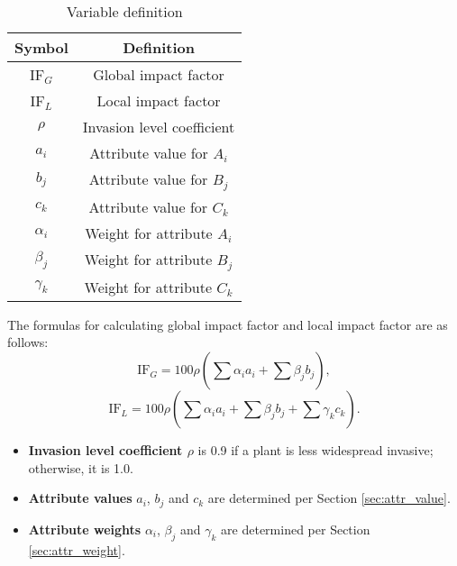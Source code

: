 \documentclass[12pt]{article}
\begin{document}
		{
			\fontsize{10}{14}\selectfont
			{
				\begin{longtable}{cc}
					
					\caption{Variable definition}
					\label{tb:syms}\\
					\toprule
					Symbol&Definition\\
					\toprule
					IF$_G$&Global impact factor\\
					IF$_L$&Local impact factor\\
					$\rho$&Invasion level coefficient\\
					$a_i$&Attribute value for $A_i$\\
					$b_j$&Attribute value for $B_j$\\
					$c_k$&Attribute value for $C_k$\\
					$\alpha_i$&Weight for attribute $A_i$\\
					$\beta_j$&Weight for attribute $B_j$\\
					$\gamma_k$&Weight for attribute $C_k$\\
					\bottomrule
					
				\end{longtable}
			}
		}
		The formulas for calculating global impact factor and local impact factor are as follows:
		\begin{equation} \label{eq:ifg}
			\mathrm{IF}_G = 100\rho \left( \sum_{} \alpha_ia_i + \sum_{} \beta_jb_j \right),
		\end{equation} 
		\begin{equation} \label{eq:ifl}
			\mathrm{IF}_L = 100\rho \left( \sum_{} \alpha_ia_i + \sum_{} \beta_jb_j + \sum_{} \gamma_kc_k \right).
		\end{equation}
		
		{
		
		\begin{itemize}
		\vspace{-0.2cm}
		\item \textbf{Invasion level coefficient $\rho$} is 0.9 if a plant is less widespread invasive; otherwise, it is 1.0.
		\vspace{-0.73cm}
		\item \textbf{Attribute values} $a_i$, $b_j$ and $c_k$ are determined per Section \ref{sec:attr_value}.
		\vspace{-0.2cm}
		\item \textbf{Attribute weights} $\alpha_i$, $\beta_j$ and $\gamma_k$ are determined per Section \ref{sec:attr_weight}.
		\end{itemize}
		}
	
\end{document}
